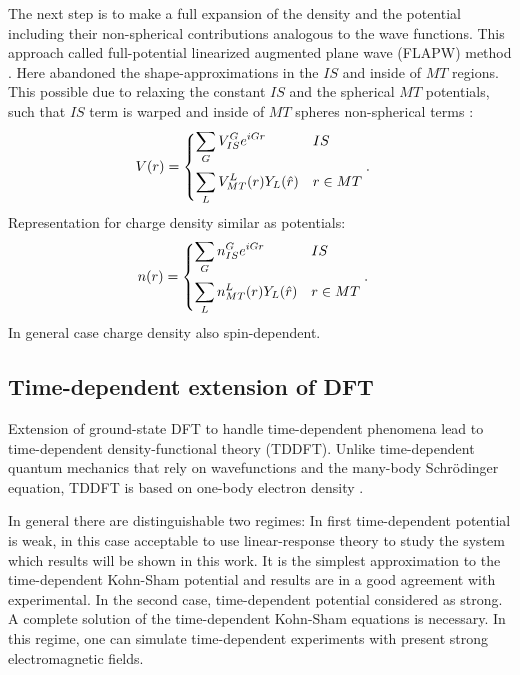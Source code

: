 The next step is to make a full expansion of the density and the potential including their non-spherical contributions analogous to the wave functions. This approach called full-potential linearized augmented plane wave (FLAPW) method \citep{1b377df636c341958da06dc78aafa8d1,PhysRevLett.42.662,PhysRevB.30.561}.
Here abandoned the shape-approximations in the $IS$ and inside of $MT$ regions. This possible due to relaxing the constant $IS$ and the spherical $MT$ potentials, such that $IS$ term is warped and inside of $MT$ spheres non-spherical terms \citep{PhysRevB.2.290,Freimuth:15619,Mokrousov:61374}:
\begin{align}
V(r)
 &=
  \begin{cases}
   \vspace{.2cm}
   \displaystyle
   \sum_G V_{IS}^{G} e^{iGr}
   & IS
   \\
   \displaystyle
   \sum_L V_{MT}^{L}(r)Y_L(\hat{r})
   & r \in MT
  \end{cases}.
\label{FAPW_potentials}
\end{align}
Representation for charge density similar as potentials:
\begin{align}
n(r)
 &=
  \begin{cases}
   \vspace{.2cm}
   \displaystyle
   \sum_G n_{IS}^G e^{iGr}
   & IS
   \\
   \displaystyle
   \sum_L n_{MT}^{L}(r)Y_L(\hat{r})
   & r \in MT
  \end{cases}.
\label{FAPW_density}
\end{align}
In general case charge density also spin-dependent.


\subsection{Time-dependent extension of DFT}

Extension of ground-state DFT to handle time-dependent phenomena lead to time-dependent density-functional theory (TDDFT). Unlike time-dependent quantum mechanics that rely on wavefunctions and the many-body Schrödinger equation, TDDFT is based on one-body electron density \citep{Marques_Gross_TDDFT}.

In general there are distinguishable two regimes: In first time-dependent potential is weak, in this case acceptable to use linear-response theory to study the system which results will be shown in this work. It is the simplest approximation to the time-dependent Kohn-Sham potential and results are in a good agreement with experimental. In the second case, time-dependent potential considered as strong. A complete solution of the time-dependent Kohn-Sham equations is necessary. In this regime, one can simulate time-dependent experiments with present strong electromagnetic fields.

